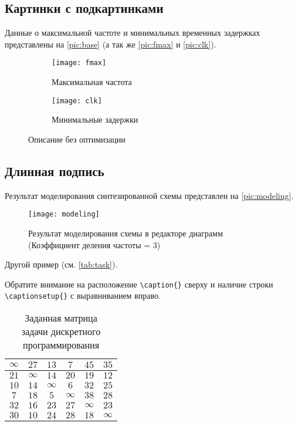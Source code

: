 \subsection{Картинки с подкартинками}

Данные о максимальной частоте и минимальных временных задержках представлены на \vref{pic:base} (а так же \vref{pic:fmax} и \vref{pic:clk}).\cite{subcap}

\begin{figure}[H]
	\begin{subfigure}{.4\linewidth}\centering
		\texttt{[image: fmax]}
		\caption{Максимальная частота}
		\label{pic:fmax}
	\end{subfigure}
	\begin{subfigure}{.6\linewidth}\centering
		\texttt{[image: clk]}
		\caption{Минимальные задержки}
		\label{pic:clk}
	\end{subfigure}
\caption{Описание без оптимизации}
\label{pic:base}
\end{figure}

\subsection{Длинная подпись}

Результат моделирования синтезированной схемы представлен на \vref{pic:modeling}. 

\begin{figure}[H]
\centering
\texttt{[image: modeling]}
\caption{Результат моделирования схемы в редакторе диаграмм \\ (Коэффициент деления частоты = 3)}
\label{pic:modeling}
\end{figure}

Другой пример (см. \vref{tab:task}). 

Обратите внимание на расположение \verb|\caption{}| сверху и наличие строки \verb|\captionsetup{}| с выравниванием вправо.

\begin{table}[H]
	\centering
	\captionsetup{justification=raggedleft}
	\caption{Заданная матрица \\ задачи дискретного программирования}
	\begin{tabular}{|c|c|c|c|c|c|}
		\hline $\infty$& $27$ & $13$ & $7$ & $45$ & $35$ \\
		\hline $21$ & $\infty$ & $14$ & $20$ & $19$ & $12$ \\
		\hline $10$ & $14$ & $\infty$ & $6$ & $32$ & $25$ \\
		\hline $7$ & $18$ & $5$ & $\infty$ & $38$ & $28$ \\
		\hline $32$ & $16$ & $23$ & $27$ & $\infty$ & $23$ \\
		\hline $30$ & $10$ & $24$ & $28$ & $18$ & $\infty$ \\
		\hline		
	\end{tabular}
	\label{tab:task}
\end{table}

